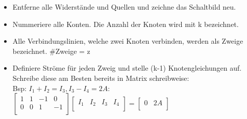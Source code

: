 					           \beginip
					            \begin{center}
					              \begin{itemize}
					                \item Entferne alle Widerstände und Quellen und zeichne das Schaltbild neu.
					                \item Nummeriere alle Konten. Die Anzahl der Knoten wird mit k bezeichnet.
					                \item Alle Verbindungslinien, welche zwei Knoten verbinden, werden als Zweige bezeichnet. \#Zweige = z
					                \item Definiere Ströme für jeden Zweig und stelle (k-1) Knotengleichungen auf. Schreibe diese am Besten bereits in Matrix schreibweise: \\
					                Bsp: $I_1 + I_2 = I_3, I_3 - I_4 = 2A $: \\
					                $
					 \left[ {\begin{array}{cccc}
					    1 & 1 & -1 & 0 \\
					    0 & 0 & 1 & -1 \\
					\end{array} } \right] \left[ {\begin{array}{c} I_1 & I_2 & I_3 & I_4 \\ \end{array} } \right] =   \left[ {\begin{array}{c}  0 & 2A\\ \end{array} } \right] $ \\


\end{itemize}
\end{center}
